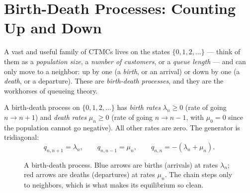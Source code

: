 \section{Birth-Death Processes: Counting Up and Down}
\label{ch27:birthdeath}

A vast and useful family of CTMCs lives on the states $\{0, 1, 2, \dots\}$ --- think of them as a
\emph{population size}, a \emph{number of customers}, or a \emph{queue length} --- and can only move
to a neighbor: up by one (a \emph{birth}, or an arrival) or down by one (a \emph{death}, or a
departure). These are \emph{birth-death processes}, and they are the workhorses of queueing theory.

\begin{definition}
\label{ch27:def-bd}
A birth-death process on $\{0,1,2,\dots\}$ has \emph{birth rates} $\lambda_n \ge 0$ (rate of going
$n \to n+1$) and \emph{death rates} $\mu_n \ge 0$ (rate of going $n \to n-1$, with $\mu_0 = 0$ since
the population cannot go negative). All other rates are zero. The generator is tridiagonal:
\[
  q_{n,n+1} = \lambda_n, \qquad q_{n,n-1} = \mu_n,
  \qquad q_{n,n} = -(\lambda_n + \mu_n).
\]
\end{definition}

\begin{figure}[H]
\centering
{}
\caption{A birth-death process. Blue arrows are births (arrivals) at rates $\lambda_n$; red arrows
are deaths (departures) at rates $\mu_n$. The chain steps only to neighbors, which is what makes its
equilibrium so clean.}
\label{ch27:fig-bd}
\end{figure}


